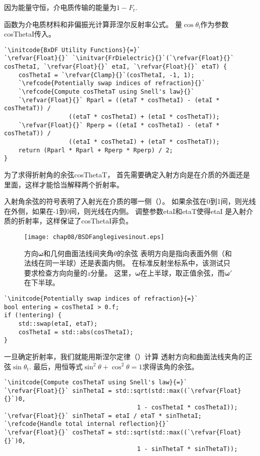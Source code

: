 因为能量守恒，介电质传输的能量为$1-F_{\mathrm{r}}$.

函数为介电质材料和非偏振光计算菲涅尔反射率公式。
量$\cos\theta_{\mathrm{i}}$作为参数{\ttfamily cosThetaI}传入。
\begin{lstlisting}
`\initcode{BxDF Utility Functions}{=}`
`\refvar{Float}{}` `\initvar{FrDielectric}{}`(`\refvar{Float}{}` cosThetaI, `\refvar{Float}{}` etaI, `\refvar{Float}{}` etaT) {
    cosThetaI = `\refvar{Clamp}{}`(cosThetaI, -1, 1);
    `\refcode{Potentially swap indices of refraction}{}`
    `\refcode{Compute cosThetaT using Snell's law}{}`
    `\refvar{Float}{}` Rparl = ((etaT * cosThetaI) - (etaI * cosThetaT)) /
                  ((etaT * cosThetaI) + (etaI * cosThetaT));
    `\refvar{Float}{}` Rperp = ((etaI * cosThetaI) - (etaT * cosThetaT)) /
                  ((etaI * cosThetaI) + (etaT * cosThetaT));
    return (Rparl * Rparl + Rperp * Rperp) / 2;
}
\end{lstlisting}

为了求得折射角的余弦{\ttfamily cosThetaT}，
首先需要确定入射方向是在介质的外面还是里面，这样才能恰当解释两个折射率。

入射角余弦的符号表明了入射光在介质的哪一侧（）。
如果余弦在0到1间，则光线在外侧，如果在-1到0间，则光线在内侧。
调整参数{\ttfamily etaI}和{\ttfamily etaT}使得{\ttfamily etaI}
是入射介质的折射率，这样保证了{\ttfamily cosThetaI}非负。

\begin{figure}[htbp]
    \centering
    \texttt{[image: chap08/BSDFanglegivesinout.eps]}
    \caption{方向$\bm\omega$和几何曲面法线间夹角$\theta$的余弦
        表明方向是指向表面外侧（和法线在同一半球）还是表面内侧。
        在标准反射坐标系中，该测试只要求检查方向向量的$z$分量。
        这里，$\bm\omega$在上半球，取正值余弦，而${\bm\omega}'$在下半球。}
    \label{fig:8.5}
\end{figure}

\begin{lstlisting}
`\initcode{Potentially swap indices of refraction}{=}`
bool entering = cosThetaI > 0.f;
if (!entering) {
    std::swap(etaI, etaT);
    cosThetaI = std::abs(cosThetaI);
}
\end{lstlisting}

一旦确定折射率，我们就能用斯涅尔定律（）计算
透射方向和曲面法线夹角的正弦$\sin\theta_{\mathrm{t}}$.
最后，用恒等式$\sin^2\theta+\cos^2\theta=1$求得该角的余弦。
\begin{lstlisting}
`\initcode{Compute cosThetaT using Snell's law}{=}`
`\refvar{Float}{}` sinThetaI = std::sqrt(std::max((`\refvar{Float}{}`)0,
                                     1 - cosThetaI * cosThetaI));
`\refvar{Float}{}` sinThetaT = etaI / etaT * sinThetaI;
`\refcode{Handle total internal reflection}{}`
`\refvar{Float}{}` cosThetaT = std::sqrt(std::max((`\refvar{Float}{}`)0,
                                     1 - sinThetaT * sinThetaT));
\end{lstlisting}

